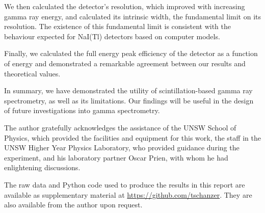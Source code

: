 \documentclass[twocol]{ametsocV6.1}
\begin{document}
We then calculated the detector's resolution, which improved with
increasing gamma ray energy, and calculated its intrinsic width, the
fundamental limit on its resolution. The existence of this fundamental limit
is consistent with the behaviour expected for NaI(Tl) detectors based
on computer models.

Finally, we calculated the full energy peak efficiency of the detector as
a function of energy and demonstrated a remarkable agreement between our
results and theoretical values.

In summary, we have demonstrated the utility of scintillation-based
gamma ray spectrometry, as well as its limitations. Our findings will be
useful in the design of future investigations into gamma spectrometry.

\clearpage
\acknowledgments
The author gratefully acknowledges the assistance of the UNSW School of Physics,
which provided the facilities and equipment for this work, the staff
in the UNSW Higher Year Physics Laboratory, who provided guidance during
the experiment, and his laboratory partner Oscar Prien, with whom he had
enlightening discussions.

\datastatement
The raw data and Python code used to produce the results in this report
are available as supplementary material
at \url{https://github.com/tschanzer}.
They are also available from the author upon request.



\end{document}
